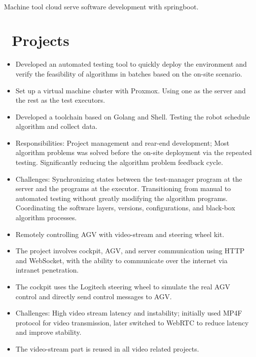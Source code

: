 \documentclass[a4paper,10pt]{resume}
\begin{document}
\\ Machine tool cloud serve software development with springboot.

\section{\faFile\ Projects}
\begin{itemize}[parsep=0.5ex]
  \item Developed an automated testing tool to quickly deploy the environment and verify the feasibility of algorithms in batches based on the on-site scenario.
  \item Set up a virtual machine cluster with Proxmox. Using one as the server and the rest as the test executors.
  \item Developed a toolchain based on Golang and Shell. Testing the robot schedule algorithm and collect data.
  \item Responsibilities: Project management and rear-end development; Most algorithm problems was solved before the on-site deployment via the repeated testing. Significantly reducing the algorithm problem feedback cycle.
  \item Challenges: Synchronizing states between the test-manager program at the server and the programs at the executor. Transitioning from manual to automated testing without greatly modifying the algorithm programs. Coordinating the software layers, versions, configurations, and black-box algorithm processes.
\end{itemize}

\begin{itemize}[parsep=0.5ex]
  \item Remotely controlling AGV with video-stream and steering wheel kit.
  \item The project involves cockpit, AGV, and server communication using HTTP and WebSocket, with the ability to communicate over the internet via intranet penetration.
  \item The cockpit uses the Logitech steering wheel to simulate the real AGV control and directly send control messages to AGV.
  \item Challenges: High video stream latency and instability; initially used MP4F protocol for video transmission, later switched to WebRTC to reduce latency and improve stability.
  \item The video-stream part is reused in all video related projects.
\end{itemize}
\end{document}
